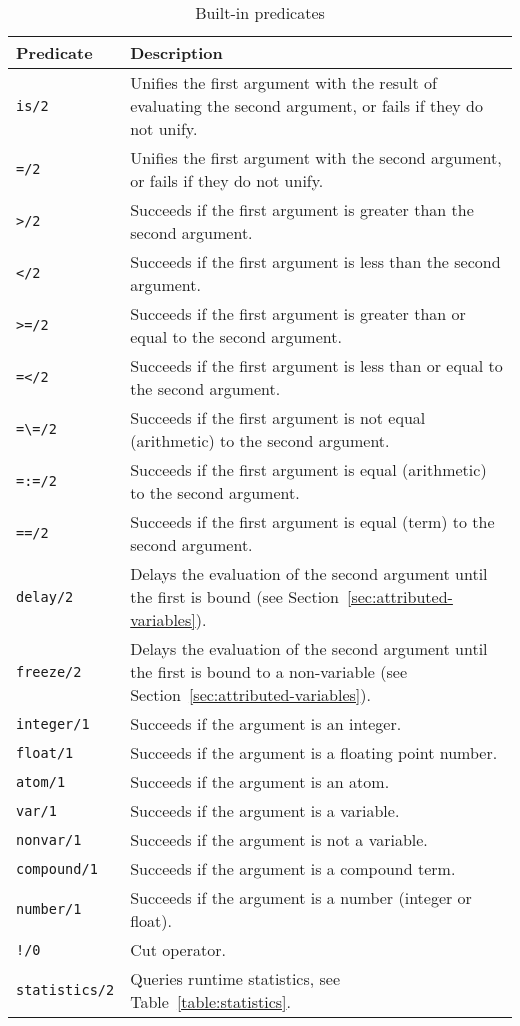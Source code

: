 \begin{appendices}
\begin{table}
\centering
\begin{tabular}{lp{12cm}}
\hline
\textbf{Predicate} & \textbf{Description} \\
\hline
\texttt{is/2} & Unifies the first argument with the result of evaluating the second argument, or fails if they do not unify. \\
\texttt{=/2} & Unifies the first argument with the second argument, or fails if they do not unify. \\
\texttt{>/2} & Succeeds if the first argument is greater than the second argument. \\
\texttt{</2} & Succeeds if the first argument is less than the second argument. \\
\texttt{>=/2} & Succeeds if the first argument is greater than or equal to the second argument. \\
\texttt{=</2} & Succeeds if the first argument is less than or equal to the second argument. \\
\texttt{=\textbackslash=/2} & Succeeds if the first argument is not equal (arithmetic) to the second argument. \\
\texttt{=:=/2} & Succeeds if the first argument is equal (arithmetic) to the second argument. \\
\texttt{==/2} & Succeeds if the first argument is equal (term) to the second argument. \\
\texttt{delay/2} & Delays the evaluation of the second argument until the first is bound (see Section~\ref{sec:attributed-variables}). \\
\texttt{freeze/2} & Delays the evaluation of the second argument until the first is bound to a non-variable (see Section~\ref{sec:attributed-variables}). \\
\texttt{integer/1} & Succeeds if the argument is an integer. \\
\texttt{float/1} & Succeeds if the argument is a floating point number. \\
\texttt{atom/1} & Succeeds if the argument is an atom. \\
\texttt{var/1} & Succeeds if the argument is a variable. \\
\texttt{nonvar/1} & Succeeds if the argument is not a variable. \\
\texttt{compound/1} & Succeeds if the argument is a compound term. \\
\texttt{number/1} & Succeeds if the argument is a number (integer or float). \\
\texttt{!/0} & Cut operator. \\
\texttt{statistics/2} & Queries runtime statistics, see Table~\ref{table:statistics}. \\
\hline
\end{tabular}
\caption{Built-in predicates}
\label{table:predicates}
\end{table}


\end{appendices}
